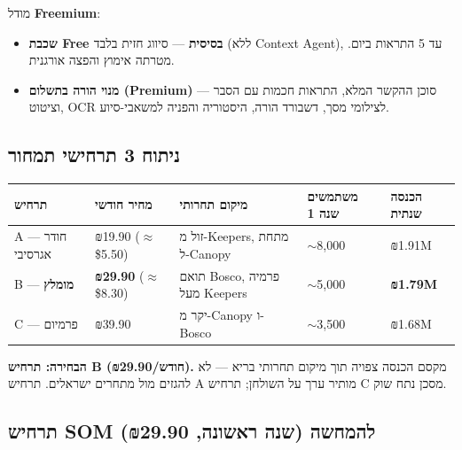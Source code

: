 \documentclass[11pt]{article}
\newcommand{\en}[1]{\textenglish{#1}}
\begin{document}
מודל \textbf{\en{Freemium}}:
\begin{itemize}[leftmargin=*]
  \item \textbf{שכבת \en{Free} בסיסית} — סיווג חזית בלבד (ללא \en{Context Agent}), עד \en{5} התראות ביום. מטרתה אימוץ והפצה אורגנית.
  \item \textbf{מנוי הורה בתשלום (\en{Premium})} — סוכן ההקשר המלא, התראות חכמות עם הסבר וציטוט, \en{OCR} לצילומי מסך, דשבורד הורה, היסטוריה והפניה למשאבי-סיוע.
\end{itemize}

\subsection*{ניתוח \en{3} תרחישי תמחור}

\begin{longtable}{|>{\raggedright\arraybackslash}p{2.5cm}|>{\raggedright\arraybackslash}p{2.4cm}|>{\raggedright\arraybackslash}p{3.5cm}|>{\raggedright\arraybackslash}p{2.5cm}|>{\raggedright\arraybackslash}p{2.4cm}|}
\hline
\rowcolor{hdr}
\textbf{תרחיש} & \textbf{מחיר חודשי} & \textbf{מיקום תחרותי} & \textbf{משתמשים שנה 1} & \textbf{הכנסה שנתית} \\
\hline
\endhead

\en{A} — חודר אגרסיבי & ₪\en{19.90} ($\approx$\en{\$5.50}) & זול מ-\en{Keepers}, מתחת ל-\en{Canopy} & $\sim$\en{8,000} & ₪\en{1.91M} \\
\hline
\rowcolor{ltgray}
\en{B} — \textbf{מומלץ} & \textbf{₪\en{29.90}} ($\approx$\en{\$8.30}) & תואם \en{Bosco}, פרמיה מעל \en{Keepers} & $\sim$\en{5,000} & \textbf{₪\en{1.79M}} \\
\hline
\en{C} — פרמיום & ₪\en{39.90} & יקר מ-\en{Canopy} ו-\en{Bosco} & $\sim$\en{3,500} & ₪\en{1.68M} \\
\hline
\end{longtable}

\textbf{הבחירה: תרחיש \en{B} (₪\en{29.90}/חודש).} מקסם הכנסה צפויה תוך מיקום תחרותי בריא — לא להגזים מול מתחרים ישראלים. תרחיש \en{A} מותיר ערך על השולחן; תרחיש \en{C} מסכן נתח שוק.

\subsection*{תרחיש \en{SOM} להמחשה (שנה ראשונה, ₪\en{29.90})}
\end{document}
